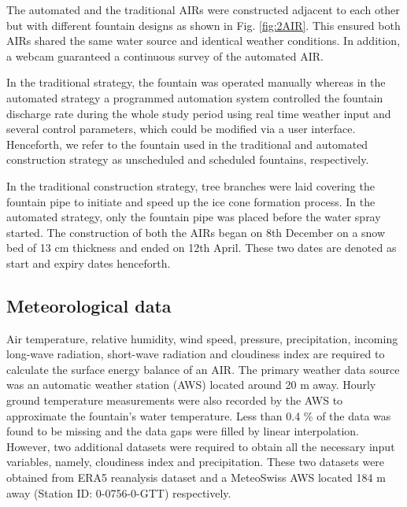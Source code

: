 \documentclass[tc, manuscript]{copernicus}
\begin{document}
The automated and the traditional AIRs were constructed adjacent to each other but with different fountain
designs as shown in Fig. \ref{fig:2AIR}. This ensured both AIRs shared the same water source and identical
weather conditions. In addition, a webcam guaranteed a continuous survey of the automated AIR.   

In the traditional strategy, the fountain was operated manually whereas in the automated strategy a programmed
automation system controlled the fountain discharge rate during the whole study period using real time weather
input and several control parameters, which could be modified via a user interface. Henceforth, we refer to the
fountain used in the traditional and automated construction strategy as unscheduled and scheduled fountains,
respectively.

In the traditional construction strategy, tree branches were laid covering the fountain pipe to initiate and
speed up the ice cone formation process. In the automated strategy, only the fountain pipe was placed before the
water spray started. The construction of both the AIRs began on 8th December on a snow bed of 13 cm thickness
and ended on 12th April. These two dates are denoted as start and expiry dates henceforth.

\subsection{Meteorological data}

Air temperature, relative humidity, wind speed, pressure, precipitation, incoming long-wave radiation,
short-wave radiation and cloudiness index are required to calculate the surface energy balance of an AIR. The
primary weather data source was an automatic weather station (AWS) located around 20 m away. Hourly ground
temperature measurements were also recorded by the AWS to approximate the fountain's water temperature. Less
than 0.4 \% of the data was found to be missing and the data gaps were filled by linear interpolation. However,
two additional datasets were required to obtain all the necessary input variables, namely, cloudiness index and
precipitation. These two datasets were obtained from ERA5 reanalysis dataset
\citep{hersbachERA5GlobalReanalysis2020} and a MeteoSwiss AWS located 184 m away (Station ID: 0-0756-0-GTT)
respectively.
\end{document}
